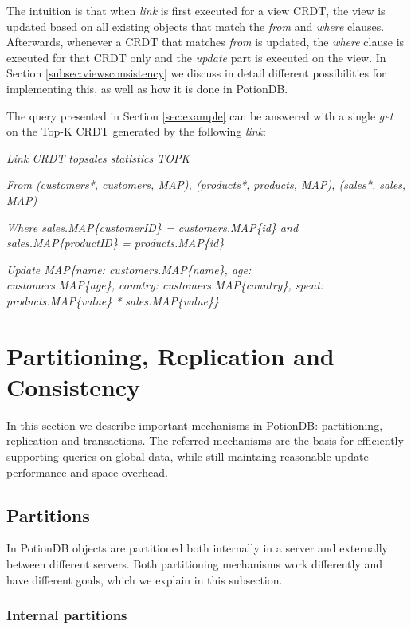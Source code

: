 \documentclass{vldb}
\newcommand{\emphvspace}{0.5\baselineskip}
\newcommand{\firstblockemph}[1]{\vspace{\emphvspace}\hspace{2em}\emph{#1}}
\newcommand{\middleblockemph}[1]{\hspace{2em}\emph{#1}}
\newcommand{\lastblockemph}[1]{\hspace{2em}\emph{#1}\vspace{\emphvspace}}
\begin{document}
The intuition is that when \emph{link} is first executed for a view CRDT, the view is updated based on all existing objects that match the \emph{from} and \emph{where} clauses.
Afterwards, whenever a CRDT that matches \emph{from} is updated, the \emph{where} clause is executed for that CRDT only and the \emph{update} part is executed on the view.
In Section \ref{subsec:viewsconsistency} we discuss in detail different possibilities for implementing this, as well as how it is done in PotionDB. %

The query presented in Section \ref{sec:example} can be answered with a single \emph{get} on the Top-K CRDT generated by the following \emph{link}:

\firstblockemph{Link CRDT topsales statistics TOPK}

\middleblockemph{From (customers*, customers, MAP), (products*, products, MAP), (sales*, sales, MAP)}

\middleblockemph{Where sales.MAP\{customerID\} = customers.MAP\{id\} \emph{and}  sales.MAP\{productID\} = products.MAP\{id\}}

\lastblockemph{Update MAP\{name: customers.MAP\{name\}, age: \\ customers.MAP\{age\}, country: customers.MAP\{country\}, spent: products.MAP\{value\} * sales.MAP\{value\}\}}

\section{Partitioning, Replication and Consistency}

In this section we describe important mechanisms in PotionDB: partitioning, replication and transactions.
The referred mechanisms are the basis for efficiently supporting queries on global data, while still maintaing reasonable update performance and space overhead.

\subsection{Partitions}

In PotionDB objects are partitioned both internally in a server and externally between different servers.
Both partitioning mechanisms work differently and have different goals, which we explain in this subsection.

\subsubsection{Internal partitions}
\end{document}
